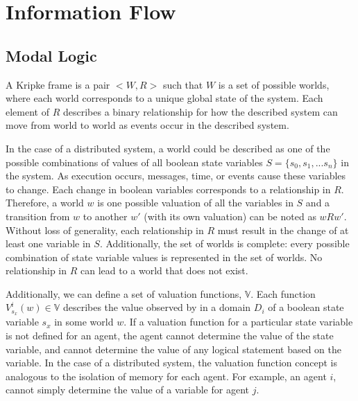 \section{Information Flow}

\subsection{Modal Logic}

A Kripke frame is a pair $<W,R>$\cite{french2006} such that $W$ is a set of possible worlds, where each world corresponds to a unique global state of the system.
Each element of $R$ describes a binary relationship for how the described system can move from world to world as events occur in the described system.

In the case of a distributed system, a world could be described as one of the possible combinations of values of all boolean state variables $S=\{s_0, s_1, ... s_n\}$ in the system.
As execution occurs, messages, time, or events cause these variables to change.
Each change in boolean variables corresponds to a relationship in $R$\cite{Gehrke200565}.
Therefore, a world $w$ is one possible valuation of all the variables in $S$ and a transition from $w$ to another $w'$ (with its own valuation) can be noted as $wRw'$.
Without loss of generality, each relationship in $R$ must result in the change of at least one variable in $S$.
Additionally, the set of worlds is complete: every possible combination of state variable values is represented in the set of worlds.
No relationship in $R$ can lead to a world that does not exist.

Additionally, we can define a set of valuation functions, $\mathbb{V}$.
Each function $V^i_{s_x}(w) \in \mathbb{V}$ describes the value observed by in a domain $D_i$ of a boolean state variable $s_x$ in some world $w$. 
If a valuation function for a particular state variable is not defined for an agent, the agent cannot determine the value of the state variable, and cannot determine the value of any logical statement based on the variable.
In the case of a distributed system, the valuation function concept is analogous to the isolation of memory for each agent.
For example, an agent $i$, cannot simply determine the value of a variable for agent $j$.

